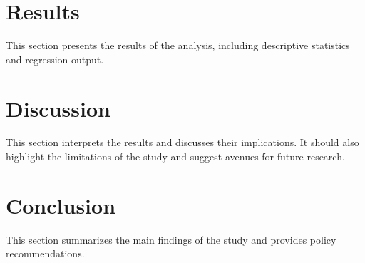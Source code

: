 \documentclass[12pt]{article}
\begin{document}
\section{Results}
This section presents the results of the analysis, including descriptive statistics and regression output.

\section{Discussion}
This section interprets the results and discusses their implications. It should also highlight the limitations of the study and suggest avenues for future research.

\section{Conclusion}
This section summarizes the main findings of the study and provides policy recommendations.



\end{document}
